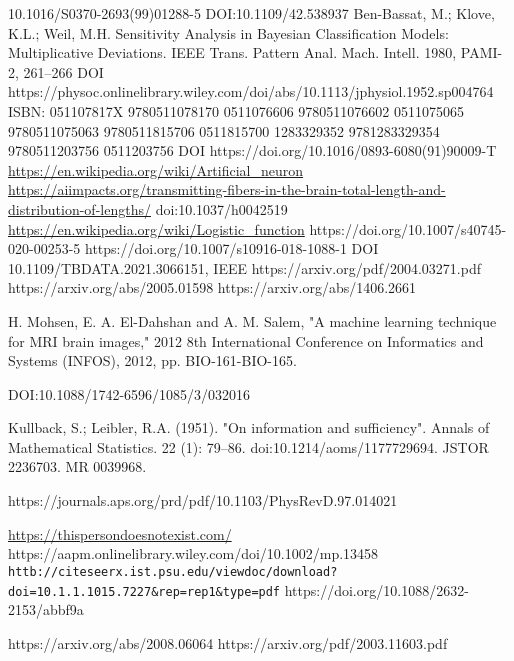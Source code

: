 \begin{thebibliography}{99}

 10.1016/S0370-2693(99)01288-5
 DOI:10.1109/42.538937
 Ben-Bassat, M.; Klove, K.L.; Weil, M.H. Sensitivity Analysis in Bayesian Classification Models: Multiplicative Deviations. IEEE Trans. Pattern Anal. Mach. Intell. 1980, PAMI-2, 261–266
  DOI https://physoc.onlinelibrary.wiley.com/doi/abs/10.1113/jphysiol.1952.sp004764
  ISBN:	051107817X 9780511078170 0511076606 9780511076602 0511075065 9780511075063 9780511815706 0511815700 1283329352 9781283329354 9780511203756 0511203756
 DOI https://doi.org/10.1016/0893-6080(91)90009-T
 \url{https://en.wikipedia.org/wiki/Artificial_neuron}
 \url{https://aiimpacts.org/transmitting-fibers-in-the-brain-total-length-and-distribution-of-lengths/}
 doi:10.1037/h0042519
 \url{https://en.wikipedia.org/wiki/Logistic_function}
 https://doi.org/10.1007/s40745-020-00253-5
https://doi.org/10.1007/s10916-018-1088-1
  DOI 10.1109/TBDATA.2021.3066151, IEEE
 https://arxiv.org/pdf/2004.03271.pdf
 https://arxiv.org/abs/2005.01598
 https://arxiv.org/abs/1406.2661

 H. Mohsen, E. A. El-Dahshan and A. M. Salem, "A machine learning technique for MRI brain images," 2012 8th International Conference on Informatics and Systems (INFOS), 2012, pp. BIO-161-BIO-165.


 DOI:10.1088/1742-6596/1085/3/032016

  Kullback, S.; Leibler, R.A. (1951). "On information and sufficiency". Annals of Mathematical Statistics. 22 (1): 79–86. doi:10.1214/aoms/1177729694. JSTOR 2236703. MR 0039968.

 https://journals.aps.org/prd/pdf/10.1103/PhysRevD.97.014021

 \url{https://thispersondoesnotexist.com/}
 https://aapm.onlinelibrary.wiley.com/doi/10.1002/mp.13458
 \verb!httb://citeseerx.ist.psu.edu/viewdoc/download?doi=10.1.1.1015.7227&rep=rep1&type=pdf! 
 https://doi.org/10.1088/2632-2153/abbf9a


 https://arxiv.org/abs/2008.06064
 https://arxiv.org/pdf/2003.11603.pdf



\end{thebibliography}
